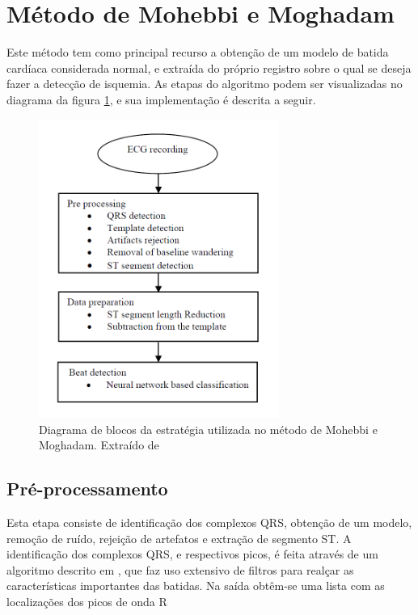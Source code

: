 
\section{Método de Mohebbi e Moghadam}
\label{sec:section3}

Este método tem como principal recurso a obtenção de um modelo de batida cardíaca considerada normal, e extraída do próprio registro sobre o qual se deseja fazer a detecção de isquemia. As etapas do algoritmo podem ser visualizadas no diagrama da figura \ref{fig:mohebbi_01}, e sua implementação é descrita a seguir.

\begin{figure}[ht]
    \centering
    \includegraphics[width=0.7\textwidth]{figures/mohebbi_01.png}
    \caption{Diagrama de blocos da estratégia utilizada no método de Mohebbi e Moghadam. Extraído de \cite{Mohebbi07}}
    \label{fig:mohebbi_01}
\end{figure}

\subsection{Pré-processamento}
\label{sec:section3_1}
Esta etapa consiste de identificação dos complexos QRS, obtenção de um modelo, remoção de ruído, rejeição de artefatos e extração de segmento ST. A identificação dos complexos QRS, e respectivos picos, é feita através de um algoritmo descrito em \cite[pp. 245-261]{Tompkins93}, que faz uso extensivo de filtros para realçar as características importantes das batidas. Na saída obtêm-se uma lista com as localizações dos picos de onda R

